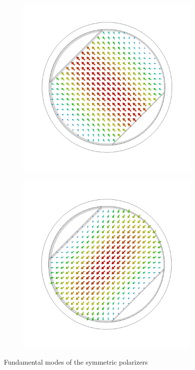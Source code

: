 \documentclass[11pt,a4paper,twoside,openany]{report}
\begin{document}
\begin{figure}[!ht]
\begin{subfigure}{.45\textwidth}
        \includegraphics[width=.75\textwidth]{src/polarizer_circular_mode1.png}
        \caption{\label{fig:circular-polarizer-mode1}}
    \end{subfigure}
    \hspace{0.5cm}
    \begin{subfigure}{.45\textwidth}
        \centering
        \includegraphics[width=.75\textwidth]{src/polarizer_circular_mode2.png}
        \caption{\label{fig:circular-polarizer-mode2}}
    \end{subfigure}
    \caption{\label{fig:symmetric-polarizer-modes}Fundamental modes of the symmetric polarizers}
\end{figure}
\end{document}
